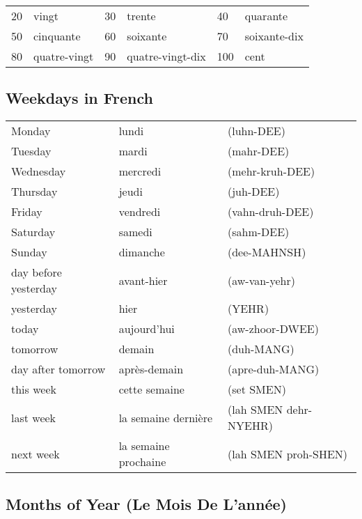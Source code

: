\begin{tabular}{| l | l | l | l | l | l |}
\hline
20  & vingt         & 30  & trente          & 40  & quarante\\
50  & cinquante     & 60  & soixante        & 70  & soixante-dix\\
80  & quatre-vingt  & 90  & quatre-vingt-dix& 100 & cent\\
\hline
\end{tabular}

\subsection{Weekdays in French}

\begin{tabular}{| l | l | l |}
\hline
Monday    & lundi     & (luhn-DEE)      \\
Tuesday   & mardi     & (mahr-DEE)      \\
Wednesday & mercredi  & (mehr-kruh-DEE) \\
Thursday  & jeudi     & (juh-DEE)       \\
Friday    & vendredi  & (vahn-druh-DEE) \\
Saturday  & samedi    & (sahm-DEE)      \\
Sunday    & dimanche  & (dee-MAHNSH)    \\
\hline
\hline
day before yesterday & avant-hier & (aw-van-yehr) \\
yesterday & hier        & (YEHR)          \\
today     & aujourd'hui & (aw-zhoor-DWEE) \\
tomorrow  & demain      & (duh-MANG)    \\
day after tomorrow & apr\`{e}s-demain & (apre-duh-MANG) \\
this week & cette semaine & (set SMEN)  \\
last week & la semaine dernière   & (lah SMEN dehr-NYEHR)\\
next week & la semaine prochaine  & (lah SMEN proh-SHEN)  \\
\hline
\end{tabular}

\subsection{Months of Year (Le Mois De L'ann\'ee)}

